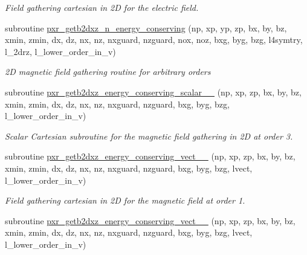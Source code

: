 \begin{DoxyCompactItemize}
\begin{DoxyCompactList}\small\item\em Field gathering cartesian in 2D for the electric field. \end{DoxyCompactList}\item 
subroutine \hyperlink{field__gathering__2d_8_f90_aa70004798c24521d5eb8c929aa0d556b}{pxr\+\_\+getb2dxz\+\_\+n\+\_\+energy\+\_\+conserving} (np, xp, yp, zp, bx, by, bz, xmin, zmin, dx, dz, nx, nz, nxguard, nzguard,                                                                                                                                                       nox, noz, bxg, byg, bzg, l4symtry, l\+\_\+2drz, l\+\_\+lower\+\_\+order\+\_\+in\+\_\+v)
\begin{DoxyCompactList}\small\item\em 2D magnetic field gathering routine for arbitrary orders \end{DoxyCompactList}\item 
subroutine \hyperlink{field__gathering__2d_8_f90_ab95a62b0f83e1ea4e5b626d47ab576ec}{pxr\+\_\+getb2dxz\+\_\+energy\+\_\+conserving\+\_\+scalar\+\_\+\_} (np, xp, zp, bx, by, bz, xmin, zmin, dx, dz, nx, nz,                                                                       nxguard, nzguard, bxg, byg, bzg, l\+\_\+lower\+\_\+order\+\_\+in\+\_\+v)
\begin{DoxyCompactList}\small\item\em Scalar Cartesian subroutine for the magnetic field gathering in 2D at order 3. \end{DoxyCompactList}\item 
subroutine \hyperlink{field__gathering__2d_8_f90_a21c413b3ee03c30a4a0333c74bbf223f}{pxr\+\_\+getb2dxz\+\_\+energy\+\_\+conserving\+\_\+vect\+\_\+\_} (np, xp, zp, bx, by, bz, xmin, zmin, dx, dz, nx, nz,                                                                       nxguard, nzguard, bxg, byg, bzg, lvect, l\+\_\+lower\+\_\+order\+\_\+in\+\_\+v)
\begin{DoxyCompactList}\small\item\em Field gathering cartesian in 2D for the magnetic field at order 1. \end{DoxyCompactList}\item 
subroutine \hyperlink{field__gathering__2d_8_f90_a5390182034479ecd8e7a2050b8124f30}{pxr\+\_\+getb2dxz\+\_\+energy\+\_\+conserving\+\_\+vect\+\_\+\_} (np, xp, zp, bx, by, bz, xmin, zmin, dx, dz, nx, nz,                                                                       nxguard, nzguard, bxg, byg, bzg, lvect, l\+\_\+lower\+\_\+order\+\_\+in\+\_\+v)

\end{DoxyCompactItemize}
